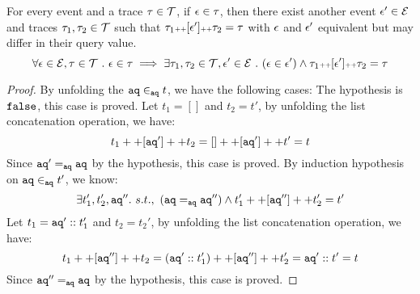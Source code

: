     \begin{coro}
    For every event and a trace $\mathtt{\tau} \in \mathcal{T}$,
    if $\mathtt{\epsilon} \in \mathtt{\tau}$, 
    then there exist another event $\mathtt{\epsilon}' \in \mathcal{E}$ and traces $\mathtt{\tau}_1, \mathtt{\tau}_2 \in \mathcal{T}$
    such that $\mathtt{\tau}_1 {\scriptscriptstyle ++} [\mathtt{\epsilon}'] {\scriptscriptstyle ++} \mathtt{\tau}_2 = \mathtt{\tau} $
    with 
    $\mathtt{\epsilon}$ and $\mathtt{\epsilon}'$ equivalent but may differ in their query value.
    \[
      \forall \mathtt{\epsilon} \in \mathcal{E}, \mathtt{\tau} \in \mathcal{T} ~.~
    \mathtt{\epsilon} \in \mathtt{\tau} \implies \exists \mathtt{\tau}_1, \mathtt{\tau}_2 \in \mathcal{T}, 
    \mathtt{\epsilon}' \in \mathcal{E} ~.~ (\mathtt{\epsilon} \in \mathtt{\epsilon}') \land \mathtt{\tau}_1 {\scriptscriptstyle ++} [\mathtt{\epsilon}'] {\scriptscriptstyle ++} \mathtt{\tau}_2 = \mathtt{\tau}  
    \]
    \end{coro}
    \begin{proof}
    By unfolding the $\mathtt{aq} \in_{\mathtt{aq}} t$, we have the following cases:
     The hypothesis is $\mathtt{false}$, this case is proved.
    Let $t_1 = []$ and $t_2 = t'$, by unfolding the list concatenation operation, we have:
    \[
        t_1 ++ [\mathtt{aq}'] ++ t_2 = [] ++ [\mathtt{aq}'] ++ t' = t
    \]
    Since $\mathtt{aq}' =_{\mathtt{aq}} \mathtt{aq}$ by the hypothesis, this case is proved.
    By induction hypothesis on $\mathtt{aq} \in_{\mathtt{aq}} t'$, we know:
    \[
        \exists t_1', t_2', \mathtt{aq}''. ~ s.t., ~ (\mathtt{aq} =_{\mathtt{aq}} \mathtt{aq}'') \land t_1' ++ [\mathtt{aq}''] ++ t_2' = t'	
    \]
    Let $t_1 = \mathtt{aq}'::t_1'$ and $t_2 = t_2'$, by unfolding the list concatenation operation, we have:
    \[
        t_1 ++ [\mathtt{aq}''] ++ t_2 = (\mathtt{aq}':: t_1') ++ [\mathtt{aq}''] ++ t_2' = \mathtt{aq}'::t' = t
    \]
    Since $\mathtt{aq}'' =_{\mathtt{aq}} \mathtt{aq}$ by the hypothesis, this case is proved.    %
    \end{proof}